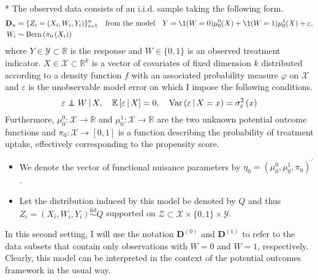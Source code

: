 \begin{boxD}
	\begin{asm}\label{asm:CATE_dgp}\mbox{}\\*
		The observed data consists of an i.i.d. sample taking the following form.
		\begin{equation}\label{DGP2}
			\begin{aligned}
				\mathbf{D}_n & = \{Z_{i} = (X_{i}, W_{i}, Y_{i})\}_{i = 1}^{n}
				\quad \text{from the model} \quad
				Y = \1(W = 0)\mu_{0}^{0}(X) + \1(W = 1)\mu_{0}^{1}(X) + \varepsilon,	\\
				W_{i} & \sim \operatorname{Bern}\left(\pi_{0}\left(X_{i}\right)\right)
			\end{aligned}
		\end{equation}
		where $Y \in \mathcal{Y} \subset \mathbb{R}$ is the response and $W \in \{0,1\}$ is an observed treatment indicator.
		$X \in \mathcal{X} \subset \mathbb{R}^k$ is a vector of covariates of fixed dimension $k$ distributed according to a density function $f$ with an associated probability measure $\varphi$ on $\mathcal{X}$ and $\varepsilon$ is the unobservable model error on which I impose the following conditions.
		\begin{equation}
			\varepsilon \perp\!\!\!\!\perp W \, | \, X, \quad
			\mathbb{E}\left[\varepsilon \, | \, X\right] = 0, \quad
			\text{Var}\left(\varepsilon \, | \, X = x\right) = \sigma_{\varepsilon}^2\left(x\right)
		\end{equation}
		Furthermore, $\mu_{0}^{0}:\mathcal{X} \rightarrow \mathbb{R}$ and $\mu_{0}^{1}:\mathcal{X} \rightarrow \mathbb{R}$ are the two unknown potential outcome functions and $\pi_{0}:\mathcal{X} \rightarrow [0,1]$ is a function describing the probability of treatment uptake, effectively corresponding to the propensity score.
        \begin{itemize}
            \item We denote the vector of functional nuisance parameters by $\eta_{0} = \left(\mu_{0}^{0}, \mu_{0}^{1}, \pi_{0}\right)^{\prime}$.
            \item Let the distribution induced by this model be denoted by $Q$ and thus $Z_{i} = \left(X_{i}, W_{i}, Y_{i}\right) \overset{\text{iid}}{\sim} Q$ supported on $\mathcal{Z} \subset \mathcal{X}\times\{0,1\}\times\mathcal{Y}$.
        \end{itemize}
	\end{asm}
\end{boxD}
In this second setting, I will use the notation $\mathbf{D}^{(0)}$ and $\mathbf{D}^{(1)}$ to refer to the data subsets that contain only observations with $W = 0$ and $W = 1$, respectively.
Clearly, this model can be interpreted in the context of the potential outcomes framework in the usual way.

